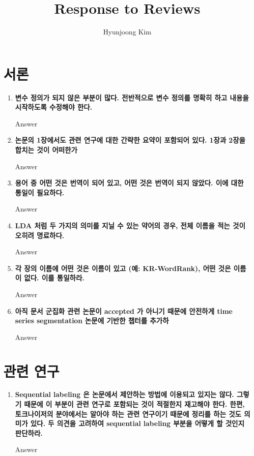 \documentclass[11pt]{article}
\begin{document}
\title{Response to Reviews}
\author{Hyunjoong Kim}
\maketitle
\smallskip

\section{서론}
\begin{enumerate}
\item \textbf{변수 정의가 되지 않은 부분이 많다. 전반적으로 변수 정의를 명확히 하고 내용을 시작하도록 수정해야 한다.}

Answer

\item \textbf{논문의 1장에서도 관련 연구에 대한 간략한 요약이 포함되어 있다. 1장과 2장을 합치는 것이 어떠한가}

Answer


\item \textbf{용어 중 어떤 것은 번역이 되어 있고, 어떤 것은 번역이 되지 않았다. 이에 대한 통일이 필요하다.}

Answer

\item \textbf{LDA 처럼 두 가지의 의미를 지닐 수 있는 약어의 경우, 전체 이름을 적는 것이 오히려 명료하다.}

Answer

\item \textbf{각 장의 이름에 어떤 것은 이름이 있고 (예: KR-WordRank), 어떤 것은 이름이 없다. 이를 통일하라.}

Answer


\item \textbf{아직 문서 군집화 관련 논문이 accepted 가 아니기 때문에 안전하게 time series segmentation 논문에 기반한 챕터를 추가하}

Answer


\end{enumerate}



\section{관련 연구}
\begin{enumerate}
\item \textbf{Sequential labeling 은 논문에서 제안하는 방법에 이용되고 있지는 않다. 그렇기 때문에 이 부분이 관련 연구로 포함되는 것이 적절한지 재고해야 한다. 한편, 토크나이저의 분야에서는 알아야 하는 관련 연구이기 때문에 정리를 하는 것도 의미가 있다. 두 의견을 고려하여 sequential labeling 부분을 어떻게 할 것인지 판단하라.}

Answer

\end{enumerate}
\end{document}
